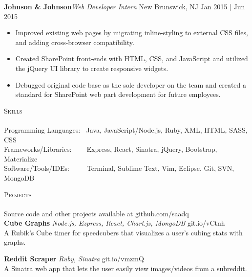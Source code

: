 \documentclass{article}
\newcommand{\lineunder} {
    \vspace*{-8pt} \\
    \hspace*{-18pt} \hrulefill \\
}
\newcommand{\header} [1] {
    {\hspace*{-18pt}\vspace*{6pt} \textsc{#1}}
    \vspace*{-6pt} \lineunder
}
\begin{document}
        {\textbf{Johnson \& Johnson}\hfill \textit{Web Developer Intern} \hfill New Brunswick, NJ \hfill Jan 2015 | Jun 2015 \\
        \vspace{-1mm}
        \begin{itemize} \itemsep 1pt
            \item Improved existing web pages by migrating inline-styling to external CSS files, and adding cross-browser compatibility.
            \item Created SharePoint front-ends with HTML, CSS, and JavaScript and utilized the jQuery UI library to create responsive widgets.
            \item Debugged original code base as the sole developer on the team and created a standard for SharePoint web part development for future employees.
        \end{itemize}



    \header{Skills}

    {Programming Languages:} $\:$ Java, JavaScript/Node.js, Ruby, XML, HTML, SASS, CSS \vspace{1mm}
    {\\Frameworks/Libraries:} $\:$ $\:$ $\:$ $\:$Express, React, Sinatra, jQuery, Bootstrap, Materialize\vspace{1mm}
    {\\Software/Tools/IDEs:} $\:$ $\:$ $\:$ $\:$ Terminal, Sublime Text, Vim, Eclipse, Git, SVN, MongoDB

    \vspace{4mm}


    \header{Projects}
    Source code and other projects available at github.com/saadq \\
    \vspace{2mm}
    {\textbf{Cube Graphs} \sl Node.js, Express, React, Chart.js, MongoDB}  \hfill git.io/vCtnh \\
    A Rubik's Cube timer for speedcubers that visualizes a user's cubing stats with graphs.  \\

    \vspace{2mm}

    {\textbf{Reddit Scraper} \sl Ruby, Sinatra}  \hfill git.io/vmzmQ  \\

    A Sinatra web app that lets the user easily view images/videos from a subreddit. \\

}
\end{document}
